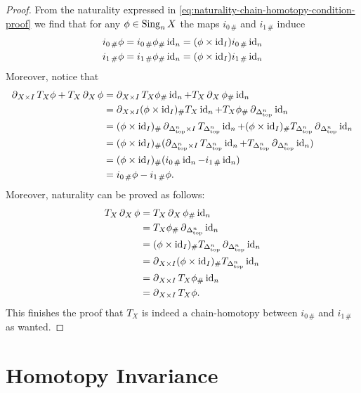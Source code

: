 \begin{proof}
From the naturality expressed in
\cref{eq:naturality-chain-homotopy-condition-proof} we find that for any \(\phi
\in \Sing_n X\) the maps \(i_{0\, \#}\) and \(i_{1\, \#}\) induce
\begin{align*}
  i_{0\, \#} \phi
  &= i_{0\, \#} \phi_{\#} \Id_n
    = (\phi \times \Id_I) i_{0\, \#} \Id_n \\
  i_{1\, \#} \phi
  &= i_{1\, \#} \phi_{\#} \Id_n
    = (\phi \times \Id_I) i_{1\, \#} \Id_n \\
\end{align*}
Moreover, notice that
\begin{align*}
  \face_{X \times I} T_X \phi + T_X \face_X \phi
  &= \face_{X \times I} T_X \phi_{\#} \Id_n
     + T_X \face_X \phi_{\#} \Id_n \\
  &= \face_{X \times I} (\phi \times \Id_I)_{\#} T_X \Id_n
    + T_X \phi_{\#} \face_{\splxtop^n} \Id_n \\
  &= (\phi \times \Id_I)_{\#} \face_{\splxtop^n \times I} T_{\splxtop^n} \Id_n
    + (\phi \times \Id_I)_{\#} T_{\splxtop^n} \face_{\splxtop^n} \Id_n \\
  &= (\phi \times \Id_I)_{\#} (\face_{\splxtop^n \times I} T_{\splxtop^n} \Id_n
    + T_{\splxtop^n} \face_{\splxtop^n} \Id_n) \\
  &= (\phi \times \Id_I)_{\#} (i_{0\, \#} \Id_n - i_{1\, \#} \Id_n) \\
  &= i_{0\, \#} \phi - i_{1\, \#} \phi.
\end{align*}
Moreover, naturality can be proved as follows:
\begin{align*}
  T_X \face_X \phi
  &= T_X \face_X \phi_{\#} \Id_n \\
  &= T_X \phi_{\#} \face_{\splxtop^n} \Id_n \\
  &= (\phi \times \Id_I)_{\#} T_{\splxtop^n} \face_{\splxtop^n} \Id_n \\
  &= \face_{X \times I} (\phi \times \Id_I)_{\#} T_{\splxtop^n} \Id_n \\
  &= \face_{X \times I} T_X \phi_{\#} \Id_n \\
  &= \face_{X \times I} T_X \phi.
\end{align*}
This finishes the proof that \(T_X\) is indeed a chain-homotopy between
\(i_{0\, \#}\) and \(i_{1\, \#}\) as wanted.
\end{proof}

\section{Homotopy Invariance}

